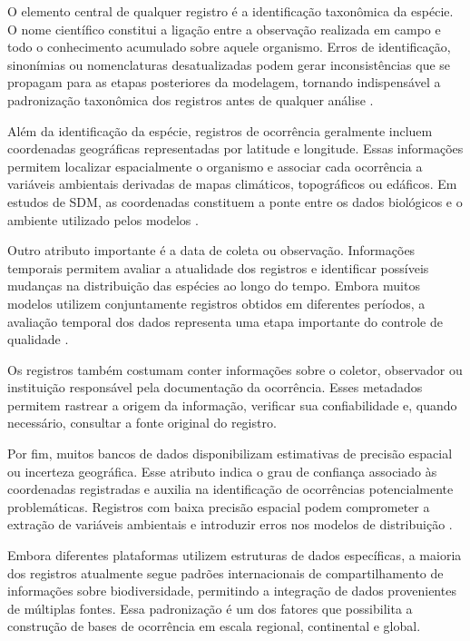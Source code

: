 O elemento central de qualquer registro é a identificação taxonômica da espécie. O nome científico constitui a ligação entre a observação realizada em campo e todo o conhecimento acumulado sobre aquele organismo. Erros de identificação, sinonímias ou nomenclaturas desatualizadas podem gerar inconsistências que se propagam para as etapas posteriores da modelagem, tornando indispensável a padronização taxonômica dos registros antes de qualquer análise \parencite{guisan2017habitat}.

Além da identificação da espécie, registros de ocorrência geralmente incluem coordenadas geográficas representadas por latitude e longitude. Essas informações permitem localizar espacialmente o organismo e associar cada ocorrência a variáveis ambientais derivadas de mapas climáticos, topográficos ou edáficos. Em estudos de SDM, as coordenadas constituem a ponte entre os dados biológicos e o ambiente utilizado pelos modelos \parencite{elith2009species}.

Outro atributo importante é a data de coleta ou observação. Informações temporais permitem avaliar a atualidade dos registros e identificar possíveis mudanças na distribuição das espécies ao longo do tempo. Embora muitos modelos utilizem conjuntamente registros obtidos em diferentes períodos, a avaliação temporal dos dados representa uma etapa importante do controle de qualidade \parencite{franklin2010mapping}.

Os registros também costumam conter informações sobre o coletor, observador ou instituição responsável pela documentação da ocorrência. Esses metadados permitem rastrear a origem da informação, verificar sua confiabilidade e, quando necessário, consultar a fonte original do registro.

Por fim, muitos bancos de dados disponibilizam estimativas de precisão espacial ou incerteza geográfica. Esse atributo indica o grau de confiança associado às coordenadas registradas e auxilia na identificação de ocorrências potencialmente problemáticas. Registros com baixa precisão espacial podem comprometer a extração de variáveis ambientais e introduzir erros nos modelos de distribuição \parencite{zizka2019coordinatecleaner}.

Embora diferentes plataformas utilizem estruturas de dados específicas, a maioria dos registros atualmente segue padrões internacionais de compartilhamento de informações sobre biodiversidade, permitindo a integração de dados provenientes de múltiplas fontes. Essa padronização é um dos fatores que possibilita a construção de bases de ocorrência em escala regional, continental e global.

